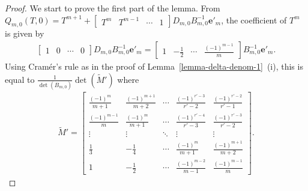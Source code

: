 \documentclass[11pt]{amsart}
\theoremstyle{definition}
\numberwithin{equation}{subsection}
\theoremstyle{plain}
\theoremstyle{plain}
\theoremstyle{plain}
\theoremstyle{plain}
\theoremstyle{plain}
\theoremstyle{plain}
\theoremstyle{plain}
\theoremstyle{plain}
\theoremstyle{plain}
\theoremstyle{plain}
\theoremstyle{plain}
\theoremstyle{plain}
\theoremstyle{definition}
\theoremstyle{definition}
\theoremstyle{definition}
\theoremstyle{remark}
\renewcommand{\(}{\textup{(}}
\renewcommand{\)}{\textup{)}}
\begin{document}
\begin{proof}
We start to prove the first part of the lemma. From $Q_{m,0}(T,0)
        =
        T^{m+1}
        +
        \begin{bmatrix}
          T^m & T^{m-1} & \cdots & 1
        \end{bmatrix}
        D_{m,0}B_{m,0}^{-1}\mathbf{e}'_m$,
the coefficient of $T^m$ is given by
    \begin{align*}
        \begin{bmatrix}
          1 & 0 & \cdots & 0
        \end{bmatrix}
        D_{m,0}B_{m,0}^{-1}\mathbf{e}'_m
        =
        \begin{bmatrix}
          1 & -\frac{1}{2} & \cdots & \frac{(-1)^{m-1}}{m}
        \end{bmatrix}
        B_{m,0}^{-1}\mathbf{e}'_m.
    \end{align*}
Using Cram\'er's rule as in the proof of Lemma~\ref{lemma-delta-denom-1}~(i), this is equal to
$\frac{1}{\det(B_{m,0})}\det(\tilde{M}')$
where
    \begin{align*}
     \tilde{M}'=
        \begin{bmatrix}
          \frac{(-1)^{m}}{m+1} & \frac{(-1)^{m+1}}{m+2} & \cdots & \frac{(-1)^{r'-3}}{r'-2} & \frac{(-1)^{r'-2}}{r'-1} \\
          \frac{(-1)^{m-1}}{m} & \frac{(-1)^{m}}{m+1} & \cdots & \frac{(-1)^{r'-4}}{r'-3} & \frac{(-1)^{r'-3}}{r'-2} \\
          \vdots & \vdots & \ddots & \vdots & \vdots \\
          \frac{1}{3} & -\frac{1}{4} & \cdots & \frac{(-1)^m}{m+1} & \frac{(-1)^{m+1}}{m+2} \\
          1 & -\frac{1}{2} & \cdots & \frac{(-1)^{m-2}}{m-1} & \frac{(-1)^{m-1}}{m}
        \end{bmatrix}.
    \end{align*}



\end{proof}
\end{document}
